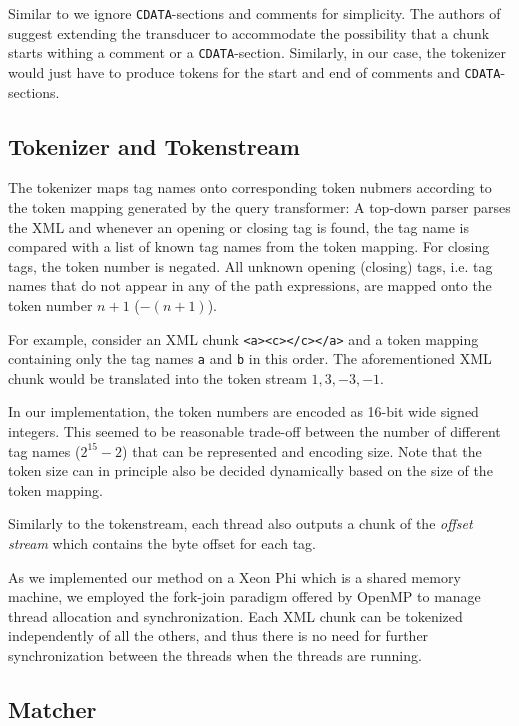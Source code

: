 Similar to  we ignore \texttt{CDATA}-sections and comments for
simplicity. The authors of  suggest extending the transducer to
accommodate the possibility that a chunk starts withing a comment or a
\texttt{CDATA}-section. Similarly, in our case, the tokenizer would just have to
produce tokens for the start and end of comments and \texttt{CDATA}-sections.

\subsection{Tokenizer and Tokenstream}

The tokenizer maps tag names onto corresponding token nubmers according to the
token mapping generated by the query transformer: A top-down parser parses the
XML and whenever an opening or closing tag is found, the tag name is compared
with a list of known tag names from the token mapping. For closing tags, the
token number is negated. All unknown opening (closing) tags, i.e. tag names that
do not appear in any of the path expressions, are mapped onto the token number
$n+1$ ($-(n+1)$).

For example, consider an XML chunk \verb;<a><c></c></a>; and a token mapping
containing only the tag names \verb;a; and \verb;b; in this order. The
aforementioned XML chunk would be translated into the token stream $1, 3, -3,
-1$.

In our implementation, the token numbers are encoded as 16-bit wide signed
integers. This seemed to be reasonable trade-off between the number of different
tag names ($2^15-2$) that can be represented and encoding size. Note that the
token size can in principle also be decided dynamically based on the size of the
token mapping.

Similarly to the tokenstream, each thread also outputs a chunk of the
\emph{offset stream} which contains the byte offset for each tag. 

As we implemented our method on a Xeon Phi  which is a
shared memory machine, we employed the fork-join paradigm offered by OpenMP
 to manage thread allocation and synchronization. Each XML chunk
can be tokenized independently of all the others, and thus there is no need for
further synchronization between the threads when the threads are running.

\subsection{Matcher}

